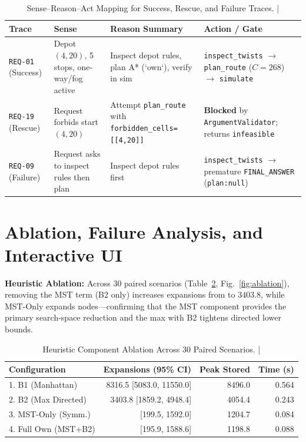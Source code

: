 \documentclass[conference]{IEEEtran}
\begin{document}
\begin{table}[t]
    \centering
    \caption{Sense--Reason--Act Mapping for Success, Rescue, and Failure Traces. | \stampline}
    \label{tab:sra}
    \scriptsize
    \begin{tabular}{@{}p{1.2cm}p{2.1cm}p{2.0cm}p{2.3cm}@{}}
        \toprule
        Trace & Sense & Reason Summary & Action / Gate \\
        \midrule
        \texttt{REQ-01} (Success) & Depot $(4,20)$, 5 stops, one-way/fog active & Inspect depot rules, plan A* (`own`), verify in sim & \texttt{inspect\_twists} $\rightarrow$ \texttt{plan\_route} ($C=268$) $\rightarrow$ \texttt{simulate} \\
        \texttt{REQ-19} (Rescue)  & Request forbids start $(4,20)$ & Attempt \texttt{plan\_route} with \texttt{forbidden\_cells=[[4,20]]} & \textbf{Blocked} by \texttt{ArgumentValidator}; returns \texttt{infeasible} \\
        \texttt{REQ-09} (Failure) & Request asks to inspect rules then plan & Inspect depot rules first & \texttt{inspect\_twists} $\rightarrow$ premature \texttt{FINAL\_ANSWER} (\texttt{plan:null}) \\
        \bottomrule
    \end{tabular}
\end{table}

\section{Ablation, Failure Analysis, and Interactive UI}
\textbf{Heuristic Ablation:} Across 30 paired scenarios (Table~\ref{tab:ablation}, Fig.~\ref{fig:ablation}), removing the MST term (B2 only) increases expansions from \numMNineAblationFullOwnExp{} to $3403.8$, while MST-Only expands \numMNineAblationMstOnlyExp{} nodes—confirming that the MST component provides the primary search-space reduction and the max with B2 tightens directed lower bounds.

\begin{table}[t]
    \centering
    \caption{Heuristic Component Ablation Across 30 Paired Scenarios. | \stampline}
    \label{tab:ablation}
    \scriptsize
    \begin{tabular}{@{}lrrr@{}}
        \toprule
        Configuration & Expansions (95\% CI) & Peak Stored & Time (s) \\
        \midrule
        1. B1 (Manhattan)    & 8316.5 [5083.0, 11550.0] & 8496.0 & 0.564 \\
        2. B2 (Max Directed) & 3403.8 [1859.2, 4948.4]  & 4054.4 & 0.243 \\
        3. MST-Only (Symm.)  & \numMNineAblationMstOnlyExp{} [199.5, 1592.0]   & 1204.7 & 0.084 \\
        4. Full Own (MST+B2) & \numMNineAblationFullOwnExp{} [195.9, 1588.6]   & 1198.8 & 0.088 \\
        \bottomrule
    \end{tabular}
\end{table}
\end{document}
